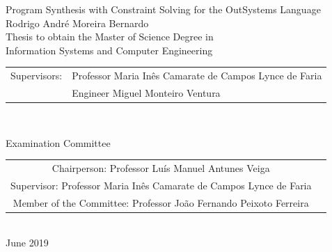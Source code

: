 \begin{center}

\vspace{2.5cm}

\vspace{1.0cm}
{\FontLb Program Synthesis with Constraint Solving for the OutSystems Language} \\
\vspace{2.7cm}
{\FontMb Rodrigo André Moreira Bernardo} \\
\vspace{2.0cm}
{\FontSn Thesis to obtain the Master of Science Degree in} \\
\vspace{0.3cm}
{\FontLb Information Systems and Computer Engineering} \\
\vspace{1.7cm} %
{\FontSn %
\begin{tabular}{ll}
	Supervisors: & Professor Maria Inês Camarate de Campos Lynce de Faria \\
	             & Engineer Miguel Monteiro Ventura \\
\end{tabular} } \\

\vspace{1.5cm}

{\FontMb Examination Committee} \\

\vspace{0.3cm}

{\FontSn %
\begin{tabular}{cc}
Chairperson: Professor Luís Manuel Antunes Veiga \\
Supervisor: Professor Maria Inês Camarate de Campos Lynce de Faria \\
Member of the Committee: Professor João Fernando Peixoto Ferreira \\
\end{tabular} } \\

\vspace{2.5cm}
{\FontMb June 2019} \\
%
\end{center}

\cleardoublepage

